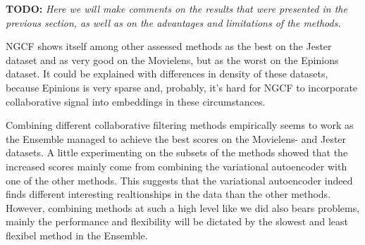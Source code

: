 \textbf{TODO: }
\textit{Here we will make comments on the results that were presented in the previous section, as well as on the advantages and limitations of the methods.}



NGCF shows itself among other assessed methods as the best on the Jester dataset 
and as very good on the Movielens, but as the worst on the Epinions dataset.
It could be explained with differences in density of these datasets, because
Epinions is very sparse and, probably, it's hard for NGCF to incorporate 
collaborative signal into embeddings in these circumstances.



Combining different collaborative filtering methods empirically seems to work as the Ensemble managed to achieve the best scores on the Movielens- and Jester datasets. A little experimenting on the subsets of the methods showed that the increased scores mainly come from combining the variational autoencoder with one of the other methods. This suggests that the variational autoencoder indeed finds different interesting realtionships in the data than the other methods. However, combining methods at such a high level like we did also bears problems, mainly the performance and flexibility will be dictated by the slowest and least flexibel method in the Ensemble.
